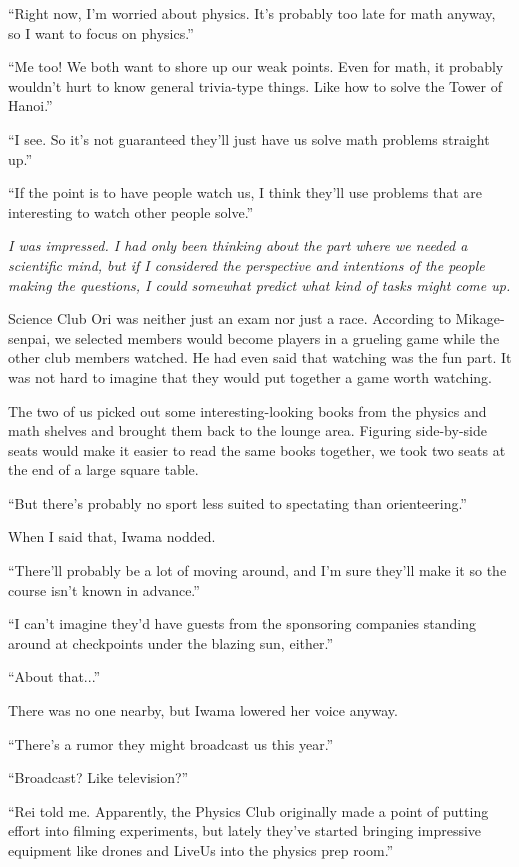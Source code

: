 \documentclass[
    a4paper,
    12pt,
    twoside,
    openany,
    UTF8,
    fontset=windows
]{ctexbook}
\begin{document}
``Right now, I'm worried about physics. It's probably too late for math anyway, so I want to focus on physics.''

``Me too! We both want to shore up our weak points. Even for math, it probably wouldn't hurt to know general trivia-type things. Like how to solve the Tower of Hanoi.''

``I see. So it's not guaranteed they'll just have us solve math problems straight up.''

``If the point is to have people watch us, I think they'll use problems that are interesting to watch other people solve.''

\textit{I was impressed. I had only been thinking about the part where we needed a scientific mind, but if I considered the perspective and intentions of the people making the questions, I could somewhat predict what kind of tasks might come up.}

Science Club Ori was neither just an exam nor just a race. According to Mikage-senpai, we selected members would become players in a grueling game while the other club members watched. He had even said that watching was the fun part. It was not hard to imagine that they would put together a game worth watching.

The two of us picked out some interesting-looking books from the physics and math shelves and brought them back to the lounge area. Figuring side-by-side seats would make it easier to read the same books together, we took two seats at the end of a large square table.

``But there's probably no sport less suited to spectating than orienteering.''

When I said that, Iwama nodded.

``There'll probably be a lot of moving around, and I'm sure they'll make it so the course isn't known in advance.''

``I can't imagine they'd have guests from the sponsoring companies standing around at checkpoints under the blazing sun, either.''

``About that...''

There was no one nearby, but Iwama lowered her voice anyway.

``There's a rumor they might broadcast us this year.''

``Broadcast? Like television?''

``Rei told me. Apparently, the Physics Club originally made a point of putting effort into filming experiments, but lately they've started bringing impressive equipment like drones and LiveUs into the physics prep room.''
\end{document}
